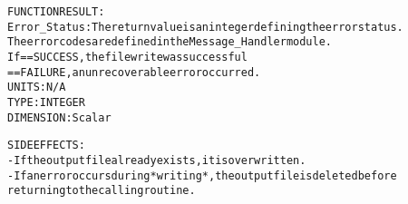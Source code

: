 \begin{alltt}
  FUNCTION RESULT:
        Error_Status:   The return value is an integer defining the error status.
                        The error codes are defined in the Message_Handler module.
                        If == SUCCESS, the file write was successful
                           == FAILURE, an unrecoverable error occurred.
                        UNITS:      N/A
                        TYPE:       INTEGER
                        DIMENSION:  Scalar
 
  SIDE EFFECTS:
        - If the output file already exists, it is overwritten.
        - If an error occurs during *writing*, the output file is deleted before
          returning to the calling routine.
 
  \end{alltt}
